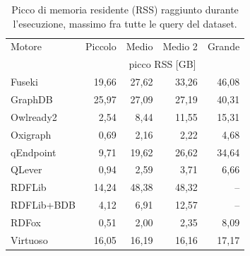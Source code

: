 \begin{table}[H]
\centering
\begin{small}
\begin{tabular}{lrrrr}
\toprule
Motore & Piccolo & Medio & Medio 2 & Grande \\
 & \multicolumn{4}{c}{picco RSS [GB]} \\
\midrule
Fuseki & 19,66 & 27,62 & 33,26 & 46,08 \\
GraphDB & 25,97 & 27,09 & 27,19 & 40,31 \\
Owlready2 & 2,54 & 8,44 & 11,55 & 15,31 \\
Oxigraph & 0,69 & 2,16 & 2,22 & 4,68 \\
qEndpoint & 9,71 & 19,62 & 26,62 & 34,64 \\
QLever & 0,94 & 2,59 & 3,71 & 6,66 \\
RDFLib & 14,24 & 48,38 & 48,32 & -- \\
RDFLib+BDB & 4,12 & 6,91 & 12,57 & -- \\
RDFox & 0,51 & 2,00 & 2,35 & 8,09 \\
Virtuoso & 16,05 & 16,19 & 16,16 & 17,17 \\
\bottomrule
\end{tabular}
\end{small}
\caption{Picco di memoria residente (RSS) raggiunto durante l'esecuzione, massimo fra tutte le query del dataset.}
\label{tab:peak_rss}
\end{table}

